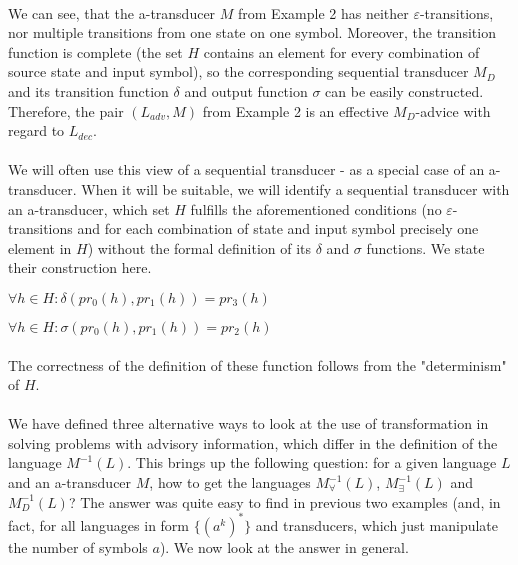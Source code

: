 \paragraph{}
\cpriklad We can see, that the a-transducer $M$ from Example 2 has neither $\varepsilon$-transitions, nor multiple transitions from one state on one symbol. Moreover, the transition function is complete (the set $H$ contains an element for every combination of source state and input symbol), so the corresponding sequential transducer $M_D$ and its transition function $\delta$ and output function $\sigma$ can be easily constructed. Therefore, the pair $(L_{adv},M)$ from Example 2 is an effective $M_{D}$-advice with regard to $L_{dec}$.

\paragraph{}
\poznamka We will often use this view of a sequential transducer - as a special case of an a-transducer. When it will be suitable, we will identify a sequential transducer with an a-transducer, which set $H$ fulfills the aforementioned conditions (no $\varepsilon$-transitions and for each combination of state and input symbol precisely one element in $H$) without the formal definition of its $\delta$ and $\sigma$ functions. We state their construction here.

\centerline{$\forall h \in H: \delta(pr_0(h),pr_1(h)) = pr_3(h)$}
\centerline{$\forall h \in H: \sigma(pr_0(h),pr_1(h)) = pr_2(h)$}

\paragraph{}
The correctness of the definition of these function follows from the "determinism" of $H$.

\paragraph{}
We have defined three alternative ways to look at the use of transformation in solving problems with advisory information, which differ in the definition of the language $M^{-1}(L)$. This brings up the following question: for a given language $L$ and an a-transducer $M$, how to get the languages $M_{\forall}^{-1}(L)$, $M_{\exists}^{-1}(L)$ and $M_{D}^{-1}(L)$? The answer was quite easy to find in previous two examples (and, in fact, for all languages in form $\{ (a^k)^* \}$ and transducers, which just manipulate the number of symbols $a$). We now look at the answer in general.

